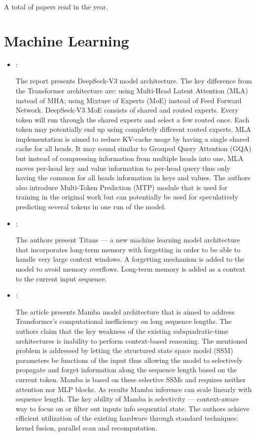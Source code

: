 



A total of  papers read in the year.

\section*{Machine Learning}
\begin{itemize}
    \item \cite{DeepSeekAI:2025:DeepSeekV3}:

    The report presents DeepSeek-V3 model architecture. The key difference from the Transformer architecture are: using Multi-Head Latent Attention (MLA) instead of MHA; using Mixture of Experts (MoE) instead of Feed Forward Network. DeepSeek-V3 MoE consists of shared and routed experts. Every token will run through the shared experts and select a few routed once. Each token may potentially end up using completely different routed experts. MLA implementation is aimed to reduce KV-cache usage by having a single shared cache for all heads. It may sound similar to Grouped Query Attention (GQA) but instead of compressing information from multiple heads into one, MLA moves per-head key and value information to per-head query thus only having the common for all heads information in keys and values. The authors also introduce Multi-Token Prediction (MTP) module that is used for training in the original work but can potentially be used for speculatively predicting several tokens in one run of the model.

    \item \cite{Behrouz:Titans:2024}:

    The authors present Titans --- a new machine learning model architecture that incorporates long-term memory with forgetting in order to be able to handle very large context windows. A forgetting mechanism is added to the model to avoid memory overflows. Long-term memory is added as a context to the current input sequence.

    \item \cite{Gu:Mamba:2024}:

    The article presents Mamba model architecture that is aimed to address Transformer's computational inefficiency on long sequence lengths. The authors claim that the key weakness of the existing subquadratic-time architectures is inability to perform context-based reasoning. The mentioned problem is addressed by letting the structured state space model (SSM) parameters be functions of the input thus allowing the model to selectively propagate and forget information along the sequence length based on the current token. Mamba is based on these selective SSMs and requires neither attention nor MLP blocks. As results Mamba inference can scale linearly with sequence length. The key ability of Mamba is selectivity --- context-aware way to focus on or filter out inputs info sequential state. The authors achieve efficient utilization of the existing hardware through standard techniques: kernel fusion, parallel scan and recomputation.
\end{itemize}


